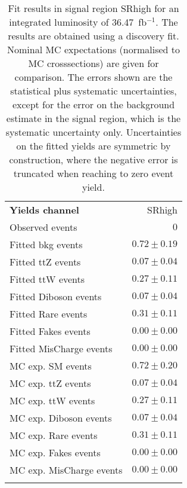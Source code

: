 

\begin{table}
\begin{center}
\setlength{\tabcolsep}{0.0pc}
{\small
\begin{tabular*}{\textwidth}{@{\extracolsep{\fill}}lr}
\noalign{\smallskip}\hline\noalign{\smallskip}
{\bfseries Yields channel}           & SRhigh              \\[-0.05cm]
\noalign{\smallskip}\hline\noalign{\smallskip}
Observed events          & $0$                    \\
\noalign{\smallskip}\hline\noalign{\smallskip}
Fitted bkg events         & $0.72 \pm 0.19$              \\
\noalign{\smallskip}\hline\noalign{\smallskip}
        Fitted ttZ events         & $0.07 \pm 0.04$              \\
        Fitted ttW events         & $0.27 \pm 0.11$              \\
        Fitted Diboson events         & $0.07 \pm 0.04$              \\
        Fitted Rare events         & $0.31 \pm 0.11$              \\
        Fitted Fakes events         & $0.00 \pm 0.00$              \\
        Fitted MisCharge events         & $0.00 \pm 0.00$              \\
 \noalign{\smallskip}\hline\noalign{\smallskip}
MC exp. SM events              & $0.72 \pm 0.20$              \\
\noalign{\smallskip}\hline\noalign{\smallskip}
        MC exp. ttZ events         & $0.07 \pm 0.04$              \\
        MC exp. ttW events         & $0.27 \pm 0.11$              \\
        MC exp. Diboson events         & $0.07 \pm 0.04$              \\
        MC exp. Rare events         & $0.31 \pm 0.11$              \\
        MC exp. Fakes events         & $0.00 \pm 0.00$              \\
        MC exp. MisCharge events         & $0.00 \pm 0.00$              \\
\noalign{\smallskip}\hline\noalign{\smallskip}
\end{tabular*}
}
\end{center}
\caption{Fit results in signal region SRhigh for an integrated luminosity of 36.47~fb$^{-1}$.
The results are obtained using a discovery fit. Nominal MC expectations (normalised to MC crosssections) are given for comparison. 
The errors shown are the statistical plus systematic uncertainties, except for the error on the background estimate in the signal region, which is the systematic uncertainty only.
Uncertainties on the fitted yields are symmetric by construction, where the negative error is truncated when reaching to zero event yield.
}
\label{table.results.systematics.in.logL.fit..Yields.SRhigh}
\end{table}
\clearpage
%